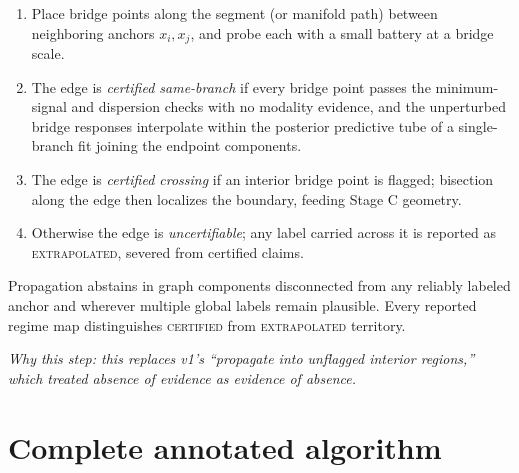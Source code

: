 \documentclass[11pt]{article}
\newcommand{\why}[1]{\par\noindent\textcolor{muted}{\small\itshape Why this step: #1}}
\begin{document}
\begin{enumerate}[label=\textbf{CERT\arabic*.},leftmargin=3.2em]
  \item Place bridge points along the segment (or manifold path) between neighboring anchors
  \(x_i,x_j\), and probe each with a small battery at a bridge scale.
  \item The edge is \emph{certified same-branch} if every bridge point passes the
  minimum-signal and dispersion checks with no modality evidence, and the unperturbed bridge
  responses interpolate within the posterior predictive tube of a single-branch fit joining
  the endpoint components.
  \item The edge is \emph{certified crossing} if an interior bridge point is flagged;
  bisection along the edge then localizes the boundary, feeding Stage C geometry.
  \item Otherwise the edge is \emph{uncertifiable}; any label carried across it is reported
  as \textsc{extrapolated}, severed from certified claims.
\end{enumerate}
Propagation abstains in graph components disconnected from any reliably labeled anchor and
wherever multiple global labels remain plausible. Every reported regime map distinguishes
\textsc{certified} from \textsc{extrapolated} territory.
\why{this replaces v1's ``propagate into unflagged interior regions,'' which treated absence
of evidence as evidence of absence.}

\section{Complete annotated algorithm}
\label{sec:algorithm}
\end{document}
